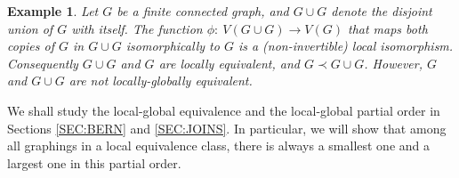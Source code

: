 \documentclass{article}
\newtheorem{example}[theorem]{Example}
\begin{document}
\begin{example}
Let $G$ be a finite connected graph, and $G \cup G$ denote the
disjoint union of $G$ with itself. The function $\phi:~V(G \cup G)\to
V(G)$ that maps both copies of $G$ in $G \cup G$ isomorphically to
$G$ is a (non-invertible) local isomorphism. Consequently $G \cup G$
and $G$ are locally equivalent, and $G \prec G \cup G$. {However,}
$G$ and $G \cup G$ are not locally-globally equivalent.
\end{example}

We shall study the local-global equivalence and the local-global
partial order in Sections \ref{SEC:BERN} and \ref{SEC:JOINS}. In
particular, we will show that among all graphings in a local
equivalence class, there is always a smallest one {and a largest one}
in this partial order.
\end{document}
